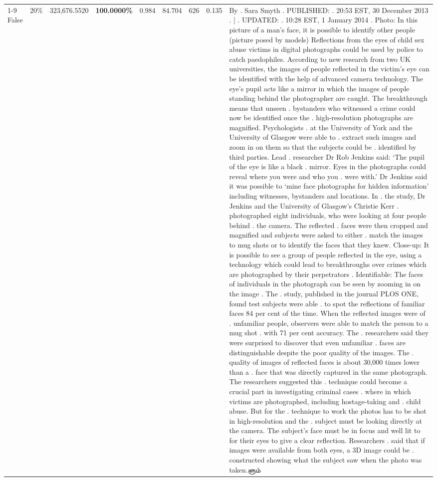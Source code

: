 \begin{table}[H]
\begin{tabular}{lllrlllll}
\cline{1-9} \cline{2-9}
False & 20\% & 323,676.5520 & \bfseries \color{red} 100.0000\% & 0.984 & 84.704 & 626 & 0.135 & By . Sara Smyth . PUBLISHED: . 20:53 EST, 30 December 2013 . | . UPDATED: . 10:28 EST, 1 January 2014 . Photo: In this picture of a man's face, it is possible to identify other people (picture posed by models) Reflections from the eyes of child sex abuse victims in digital photographs could be used by police to catch paedophiles. According to new research from two UK universities, the images of people reflected in the victim's eye can be identified with the help of advanced camera technology. The eye's pupil acts like a mirror in which the images of people standing behind the photographer are caught. The breakthrough means that unseen . bystanders who witnessed a crime could now be identified once the . high-resolution photographs are magnified. Psychologists . at the University of York and the University of Glasgow were able to . extract such images and zoom in on them so that the subjects could be . identified by third parties. Lead . researcher Dr Rob Jenkins said: ‘The pupil of the eye is like a black . mirror. Eyes in the photographs could reveal where you were and who you . were with.' Dr Jenkins said it was possible to ‘mine face photographs for hidden information' including witnesses, bystanders and locations. In . the study, Dr Jenkins and the University of Glasgow's Christie Kerr . photographed eight individuals, who were looking at four people behind . the camera. The reflected . faces were then cropped and magnified and subjects were asked to either . match the images to mug shots or to identify the faces that they knew. Close-up: It is possible to see a group of people reflected in the eye, using a technology which could lead to breakthroughs over crimes which are photographed by their perpetrators . Identifiable: The faces of individuals in the photograph can be seen by zooming in on the image . The . study, published in the journal PLOS ONE, found test subjects were able . to spot the reflections of familiar faces 84 per cent of the time. When the reflected images were of . unfamiliar people, observers were able to match the person to a mug shot . with 71 per cent accuracy. The . researchers said they were surprised to discover that even unfamiliar . faces are distinguishable despite the poor quality of the images. The . quality of images of reflected faces is about 30,000 times lower than a . face that was directly captured in the same photograph. The researchers suggested this . technique could become a crucial part in investigating criminal cases . where in which victims are photographed, including hostage-taking and . child abuse. But for the . technique to work the photos has to be shot in high-resolution and the . subject must be looking directly at the camera. The subject's face must be in focus and well lit to for their eyes to give a clear reflection. Researchers . said that if images were available from both eyes, a 3D image could be . constructed showing what the subject saw when the photo was taken.ளும் \\

\end{tabular}
\end{table}
